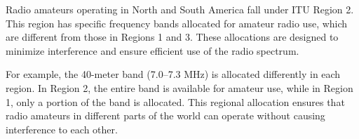 Radio amateurs operating in North and South America fall under ITU Region 2. This region has specific frequency bands allocated for amateur radio use, which are different from those in Regions 1 and 3. These allocations are designed to minimize interference and ensure efficient use of the radio spectrum.

For example, the 40-meter band (7.0–7.3 MHz) is allocated differently in each region. In Region 2, the entire band is available for amateur use, while in Region 1, only a portion of the band is allocated. This regional allocation ensures that radio amateurs in different parts of the world can operate without causing interference to each other.

